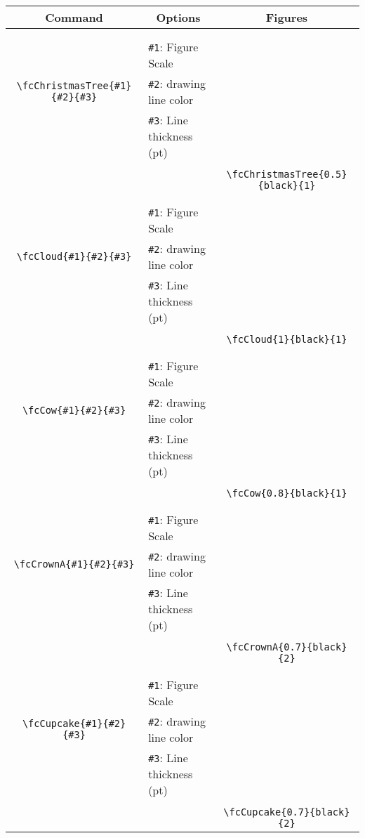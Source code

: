 \documentclass[x11names]{article}
\begin{document}
\begin{table}[H]\centering\begin{tabular}{|c|l|c|}\hline {\bf Command}& \multicolumn{1}{c|}{{\bf Options}} & {\bf Figures}\\  \hline	&&\multirow{5}{*}{\fcChristmasTree{0.5}{black}{1}}\\	&&\\	&\verb|#1|: Figure Scale &\\	\verb|\fcChristmasTree{#1}{#2}{#3}|&	\verb|#2|: drawing line color &\\	&\verb|#3|: Line thickness (pt) &\\ &&\\&&	\verb|\fcChristmasTree{0.5}{black}{1}|\\\hline 	
	&&\multirow{5}{*}{\fcCloud{1}{black}{1}}\\	&&\\	&\verb|#1|: Figure Scale &\\	\verb|\fcCloud{#1}{#2}{#3}|&	\verb|#2|: drawing line color &\\	&\verb|#3|: Line thickness (pt) &\\ &&\\&&	\verb|\fcCloud{1}{black}{1}|\\\hline 	
	&&\multirow{5}{*}{\fcCow{0.8}{black}{1}}\\	&&\\	&\verb|#1|: Figure Scale &\\	\verb|\fcCow{#1}{#2}{#3}|&	\verb|#2|: drawing line color &\\	&\verb|#3|: Line thickness (pt) &\\ &&\\&&	\verb|\fcCow{0.8}{black}{1}|\\\hline 	
	&&\multirow{5}{*}{\fcCrownA{0.7}{black}{2}}\\	&&\\	&\verb|#1|: Figure Scale &\\	\verb|\fcCrownA{#1}{#2}{#3}|&	\verb|#2|: drawing line color &\\	&\verb|#3|: Line thickness (pt) &\\ &&\\&&	\verb|\fcCrownA{0.7}{black}{2}|\\\hline 	
	&&\multirow{5}{*}{\fcCupcake{0.7}{black}{2}}\\	&&\\	&\verb|#1|: Figure Scale &\\	\verb|\fcCupcake{#1}{#2}{#3}|&	\verb|#2|: drawing line color &\\	&\verb|#3|: Line thickness (pt) &\\ &&\\&&	\verb|\fcCupcake{0.7}{black}{2}|\\\hline 	

\end{tabular}
\end{table}
\end{document}
